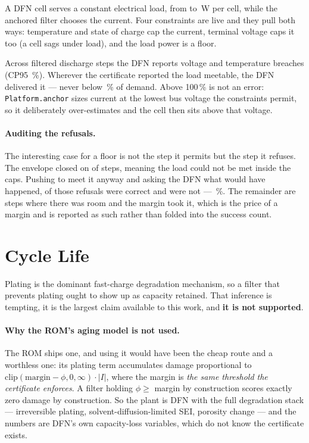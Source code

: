 \documentclass[11pt,letterpaper]{article}
\theoremstyle{definition}
\theoremstyle{remark}
\begin{document}
A DFN cell serves a constant electrical load, from \dcLoadLo{} to \dcLoadHi\,W per cell, while
the anchored filter chooses the current. Four constraints are live and they pull both ways:
temperature and state of charge cap the current, terminal voltage caps it too (a cell sags under
load), and the load power is a floor.

Across \dcSteps{} filtered discharge steps the DFN reports \dcBreachV{} voltage and \dcBreachT{}
temperature breaches (CP95 \dcCP\,\%). Wherever the certificate reported the load meetable, the
DFN delivered it --- never below \dcServed\,\% of demand. Above 100\,\% is not an error:
\texttt{Platform.anchor} sizes current at the lowest bus voltage the constraints permit, so it
deliberately over-estimates and the cell then sits above that voltage.

\paragraph{Auditing the refusals.} The interesting case for a floor is not the step it
permits but the step it refuses. The envelope closed on \dcRefused{} of \dcSteps{} steps, meaning
the load could not be met inside the caps. Pushing to meet it anyway and asking the DFN what
would have happened, \dcRight{} of those refusals were correct and \dcWrong{} were not ---
\dcPrecision\,\%. The remainder are steps where there was room and the margin took it, which is
the price of a margin and is reported as such rather than folded into the success count.


\section{Cycle Life}\label{sec:cyclelife}

Plating is the dominant fast-charge degradation mechanism, so a filter that prevents plating
ought to show up as capacity retained. That inference is tempting, it is the largest claim
available to this work, and \textbf{it is not supported}.

\paragraph{Why the ROM's aging model is not used.} The ROM ships one, and using it would have been the
cheap route and a worthless one: its plating term accumulates damage proportional to
$\mathrm{clip}(\text{margin} - \phi, 0, \infty)\cdot|I|$, where the margin is \emph{the same
threshold the certificate enforces}. A filter holding $\phi \ge$ margin by construction scores
exactly zero damage by construction. So the plant is DFN with the full degradation stack ---
irreversible plating, solvent-diffusion-limited SEI, porosity change --- and the numbers are
DFN's own capacity-loss variables, which do not know the certificate exists.
\end{document}
